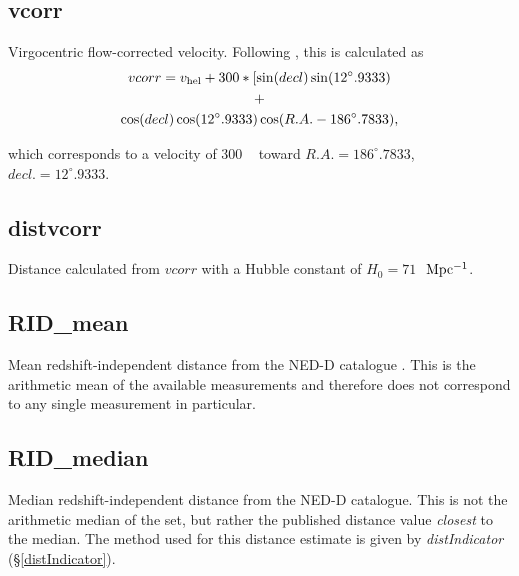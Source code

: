 \subsection{vcorr} \label{vcorr}
Virgocentric flow-corrected velocity. Following \cite{huchra1982, geller1983}, this is calculated as
\begin{gather*}
	vcorr = v_{\rm hel} + 300*[\sin(decl) \sin(12^{\circ}.9333) \\
	+ \\
	\cos(decl) \cos(12^{\circ}.9333) \cos(R.A. - 186^{\circ}.7833),
\end{gather*}

\noindent which corresponds to a velocity of 300 \kms~ toward $R.A. = 186^{\circ}.7833$, $decl. = 12^{\circ}.9333$.



\subsection{distvcorr} \label{distvcorr}
Distance calculated from $vcorr$ with a Hubble constant of $H_0 = 71$ \kms $~\rm Mpc^{-1}$.

\subsection{RID\_mean} \label{RID_mean}
Mean redshift-independent distance from the NED-D catalogue \citep{tully2009}. This is the arithmetic mean of the available measurements and therefore does not correspond to any single measurement in particular.

\subsection{RID\_median} \label{RID_median}
Median redshift-independent distance from the NED-D catalogue. This is not the arithmetic median of the set, but rather the published distance value \emph{closest} to the median. The method used for this distance estimate is given by \emph{distIndicator} (\S \ref{distIndicator}).

